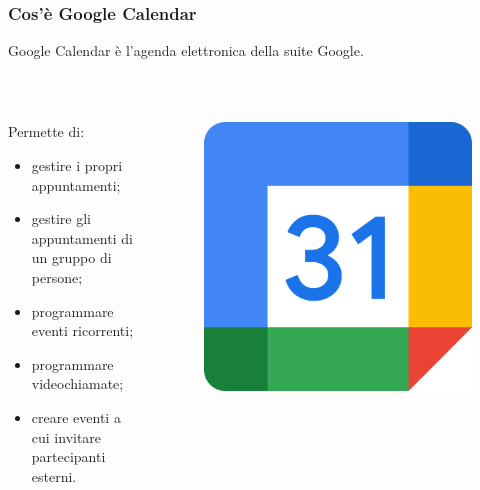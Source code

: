 \documentclass[]{beamer}
\begin{document}
\begin{frame}
\frametitle{Cos'è Google Calendar}
Google Calendar è l'\alert{agenda elettronica} della suite Google.\pause

~

\begin{columns}
\begin{column}{.7\textwidth}
  Permette di:
  \begin{itemize}
    \item gestire i propri appuntamenti;\pause
    \item gestire gli appuntamenti di un gruppo di persone;\pause
    \item programmare eventi ricorrenti;\pause
    \item programmare videochiamate;\pause
    \item creare eventi a cui invitare partecipanti esterni.
  \end{itemize}  
\end{column}
\begin{column}{.2\textwidth}
  \begin{figure}
    \includegraphics[width=\columnwidth]{img/calendarlogo.png}
  \end{figure}
\end{column}
\end{columns}
\end{frame}
\end{document}
